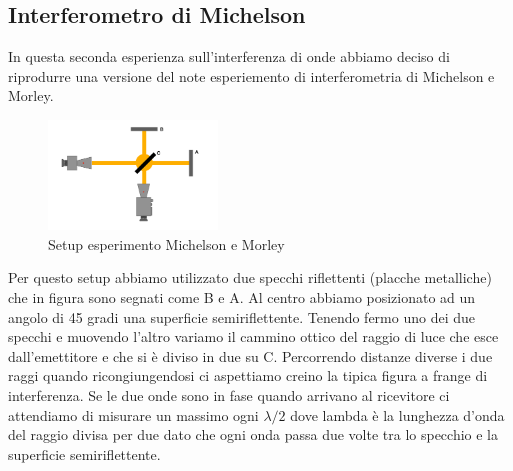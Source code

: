 \documentclass[letterpaper,12pt]{article}
\begin{document}
\subsection{Interferometro di Michelson}
In questa seconda esperienza sull'interferenza di onde abbiamo deciso di riprodurre una versione del note esperiemento di 
interferometria di Michelson e Morley.
\begin{figure}[h!]
	\centering
	\includegraphics[width = 0.4\textwidth]{MichelsonSetup.png}
	\caption{Setup esperimento Michelson e Morley}
	\label{fig:GraficoBragg}
\end{figure}
Per questo setup abbiamo utilizzato due specchi riflettenti (placche metalliche)
che in figura sono segnati come B e A. Al centro abbiamo posizionato ad un angolo di 45 gradi una superficie semiriflettente.
Tenendo fermo uno dei due specchi e muovendo l'altro variamo il cammino ottico del raggio di luce che esce dall'emettitore e che si è diviso in due su C.
Percorrendo distanze diverse i due raggi quando ricongiungendosi ci aspettiamo creino la tipica figura a frange di interferenza.  
Se le due onde sono in fase quando arrivano al ricevitore ci attendiamo di misurare un massimo ogni $\lambda/2$ dove lambda è la lunghezza d'onda del raggio divisa per due dato che 
ogni onda passa due volte tra lo specchio e la superficie semiriflettente.
\end{document}
